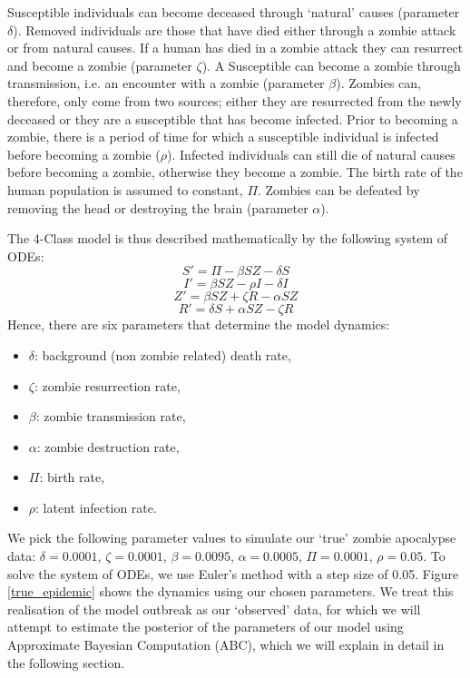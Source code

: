 \documentclass[]{article}
\begin{document}
Susceptible individuals can become deceased through `natural' causes (parameter $\delta$). Removed individuals are those that have died either through a zombie attack or from natural causes. If a human has died in a zombie attack they can resurrect and become a zombie (parameter $\zeta$). A Susceptible can become a zombie through transmission, i.e. an encounter with a zombie (parameter $\beta$). Zombies can, therefore, only come from two sources; either they are resurrected from the newly deceased or they are a susceptible that has become infected. Prior to becoming a zombie, there is a period of time for which a susceptible individual is infected before becoming a zombie ($\rho$). Infected individuals can still die of natural causes before becoming a zombie, otherwise they become a zombie. The birth rate of the human population is assumed to constant, $\Pi$. Zombies can be defeated by removing the head or destroying the brain (parameter $\alpha$). 

The 4-Class model is thus described mathematically by the following system of ODEs:
\[S' = \Pi - \beta SZ - \delta S\]
\[I' = \beta SZ - \rho I - \delta I\]
\[Z' = \beta SZ + \zeta R - \alpha SZ\]
\[R' = \delta S + \alpha SZ - \zeta R\]
Hence, there are six parameters that determine the model dynamics: 
\begin{itemize}
	\item $\delta$: background (non zombie related) death rate,
	\item $\zeta$: zombie resurrection rate,
	\item $\beta$: zombie transmission rate,
	\item $\alpha$: zombie destruction rate,
	\item $\Pi$: birth rate,
	\item $\rho$: latent infection rate.
\end{itemize}

We pick the following parameter values to simulate our `true' zombie apocalypse data: $\delta=0.0001$, $\zeta= 0.0001$, $\beta=0.0095$, $\alpha=0.0005$, $\Pi=0.0001$, $\rho=0.05$. To solve the system of ODEs, we use Euler's method with a step size of 0.05. Figure \ref{true_epidemic} shows the dynamics using our chosen parameters. We treat this realisation of the model outbreak as our `observed' data, for which we will attempt to estimate the posterior of the parameters of our model using Approximate Bayesian Computation (ABC), which we will explain in detail in the following section.
\end{document}
